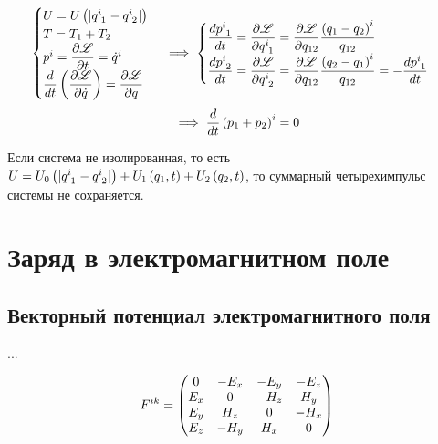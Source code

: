 \documentclass{article}
\DeclarePairedDelimiter\abs{\lvert}{\rvert}%
\begin{document}
\begin{equation*}
    \begin{cases}
    U=U\left(\abs{\tensor{q}{^i_1}-\tensor{q}{^i_2}}\right)\\
    T=T_1+T_2\\
    \tensor{p}{^i}=\dfrac{\partial\mathscr{L}}{\partial t}=\tensor{\dot{q}}{^i}\\
    \dfrac{d}{dt}\left(\dfrac{\partial\mathscr{L}}{\partial\dot{q}}\right)=\dfrac{\partial\mathscr{L}}{\partial q}
    \end{cases}\implies
    \begin{cases}
    \dfrac{d\tensor{p}{^i_1}}{dt}=\dfrac{\partial\mathscr{L}}{\partial\tensor{q}{^i_1}}=\dfrac{\partial\mathscr{L}}{\partial q_{12}}\dfrac{\tensor{\left(q_1-q_2\right)}{^i}}{q_{12}}\\
    \dfrac{d\tensor{p}{^i_2}}{dt}=\dfrac{\partial\mathscr{L}}{\partial\tensor{q}{^i_2}}=\dfrac{\partial\mathscr{L}}{\partial q_{12}}\dfrac{\tensor{\left(q_2-q_1\right)}{^i}}{q_{12}}=-\dfrac{d\tensor{p}{^i_1}}{dt}
    \end{cases}
\end{equation*}
\begin{equation*}
    \implies
    \dfrac{d}{dt}\tensor{\left(p_1+p_2\right)}{^i}=0
\end{equation*}

Если система не изолированная, то есть $U=U_0\left(\abs{\tensor{q}{^i_1}-\tensor{q}{^i_2}}\right)+U_1\left(q_1,t\right)+U_2\left(q_2,t\right)$, то суммарный четырехимпульс системы не сохраняется.

\section{Заряд в электромагнитном поле}

\subsection{Векторный потенциал электромагнитного поля}

...

\begin{equation}\label{eq:fmatrix}
    \tensor{F}{^i^k} =
    \begin{pmatrix}
        0 & -E_x & -E_y & -E_z \\
        E_x & 0 & -H_z & H_y \\
        E_y & H_z & 0 & -H_x \\
        E_z & -H_y & H_x & 0
    \end{pmatrix}
\end{equation}
\end{document}
